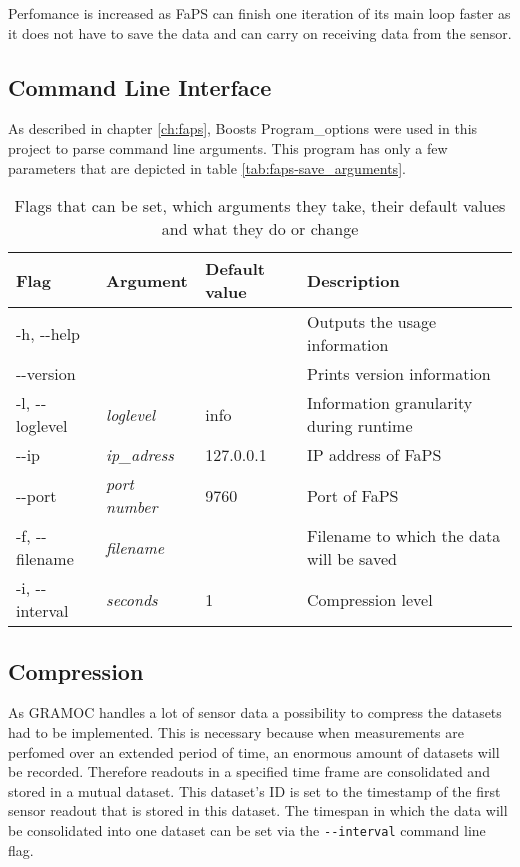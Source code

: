 Perfomance is increased as FaPS can finish one iteration of its main loop faster as it does not have to save the data and can carry on receiving data from the sensor.

\subsection{Command Line Interface}

As described in chapter \vref{ch:faps}, Boosts Program\_options were used in this project to parse command line arguments. This program has only a few parameters that are depicted in table \vref{tab:faps-save_arguments}.

\begin{table}[h]
    \centering
    \begin{tabular}{| l | l | l | p{5cm} |}
    \hline
    \textbf{Flag} & \textbf{Argument} & \textbf{Default value} & \textbf{Description} \\ \hline
    -h, -{}-help & & & Outputs the usage information \\ \hline
    -{}-version & & & Prints version information \\ \hline
    -l, -{}-loglevel & \textit{loglevel} & info & Information granularity during runtime \\ \hline
    -{}-ip & \textit{ip\_adress} & 127.0.0.1 & IP address of FaPS \\ \hline
    -{}-port & \textit{port number} & 9760 & Port of FaPS \\ \hline
    -f, -{}-filename & \textit{filename} & & Filename to which the data will be saved \\ \hline
    -i, -{}-interval & \textit{seconds} & 1 & Compression level \\ \hline
    \end{tabular}
    \caption{Flags that can be set, which arguments they take, their default values and what they do or change}
    \label{tab:faps-save_arguments}
\end{table}

\subsection{Compression}

As GRAMOC handles a lot of sensor data a possibility to compress the datasets had to be implemented. This is necessary because when measurements are perfomed over an extended period of time, an enormous amount of datasets will be recorded. Therefore readouts in a specified time frame are consolidated and stored in a mutual dataset. This dataset's ID is set to the timestamp of the first sensor readout that is stored in this dataset. The timespan in which the data will be consolidated into one dataset can be set via the \lstinline{--interval} command line flag.

